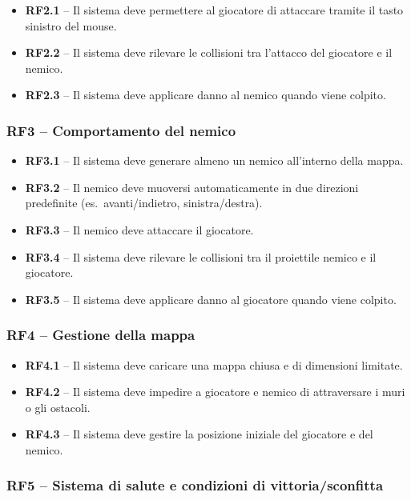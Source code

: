 \documentclass[12pt,a4paper]{article}
\newcommand{\req}[2]{%
  \noindent\textbf{#1} -- #2\par\smallskip
}
\begin{document}
\begin{small}
\begin{itemize}[leftmargin=2em]
  \item \req{RF2.1}{Il sistema deve permettere al giocatore di attaccare tramite il tasto sinistro
    del mouse.}
  \item \req{RF2.2}{Il sistema deve rilevare le collisioni tra l'attacco del giocatore e il nemico.}
  \item \req{RF2.3}{Il sistema deve applicare danno al nemico quando viene colpito.}
\end{itemize}

\subsubsection{RF3 – Comportamento del nemico}

\begin{itemize}[leftmargin=2em]
  \item \req{RF3.1}{Il sistema deve generare almeno un nemico all'interno della mappa.}
  \item \req{RF3.2}{Il nemico deve muoversi automaticamente in due direzioni predefinite
    (es.\ avanti/indietro, sinistra/destra).}
  \item \req{RF3.3}{Il nemico deve attaccare il giocatore.}
  \item \req{RF3.4}{Il sistema deve rilevare le collisioni tra il proiettile nemico e il giocatore.}
  \item \req{RF3.5}{Il sistema deve applicare danno al giocatore quando viene colpito.}
\end{itemize}

\subsubsection{RF4 – Gestione della mappa}

\begin{itemize}[leftmargin=2em]
  \item \req{RF4.1}{Il sistema deve caricare una mappa chiusa e di dimensioni limitate.}
  \item \req{RF4.2}{Il sistema deve impedire a giocatore e nemico di attraversare i muri o gli
    ostacoli.}
  \item \req{RF4.3}{Il sistema deve gestire la posizione iniziale del giocatore e del nemico.}
\end{itemize}

\subsubsection{RF5 – Sistema di salute e condizioni di vittoria/sconfitta}


\end{small}
\end{document}
